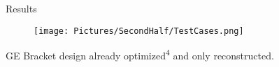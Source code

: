 

\begin{frame}{Results}
\begin{figure}
		\texttt{[image: Pictures/SecondHalf/TestCases.png]}
		\end{figure}
GE Bracket design already optimized\textsuperscript{4} and only reconstructed.
\end{frame}









